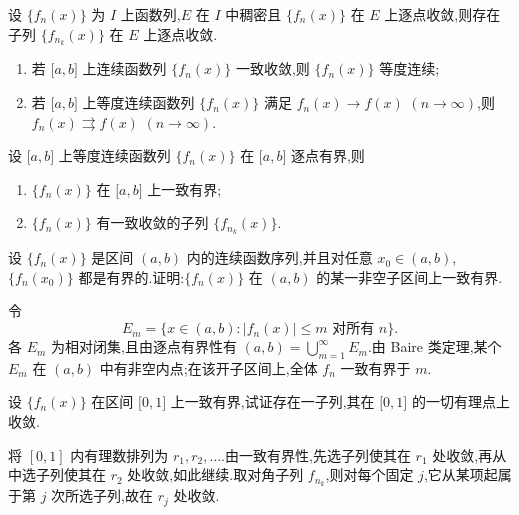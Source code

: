 \begin{theorem}[
        \markstar]
    设 $\{f_n(x)\}$ 为 $I$ 上函数列,$E$ 在 $I$ 中稠密且 $\{f_n(x)\}$ 在 $E$ 上逐点收敛,则存在子列 $\{f_{n_k}(x)\}$ 在 $E$ 上逐点收敛.
\end{theorem}

\begin{theorem}[\markstar]
    \leavevmode
    \begin{enumerate}
        \item 若 $\lbrack a,b\rbrack$ 上连续函数列 $\{f_n(x)\}$ 一致收敛,则 $\{f_n(x)\}$ 等度连续;
        \item 若 $\lbrack a,b\rbrack$ 上等度连续函数列 $\{f_n(x)\}$ 满足 $f_n(x)\to f(x)$ $(n\to\infty)$,则 $f_n(x)\rightrightarrows f(x)$ $(n\to\infty)$.
    \end{enumerate}
\end{theorem}

\begin{theorem}[\markstar]
    设 $\lbrack a,b\rbrack$ 上等度连续函数列 $\{f_n(x)\}$ 在 $\lbrack a,b\rbrack$ 逐点有界,则
    \begin{enumerate}
        \item $\{f_n(x)\}$ 在 $\lbrack a,b\rbrack$ 上一致有界;
        \item $\{f_n(x)\}$ 有一致收敛的子列 $\{f_{n_k}(x)\}$.
    \end{enumerate}
\end{theorem}

\begin{example}
    设 $\{f_n(x)\}$ 是区间 $(a,b)$ 内的连续函数序列,并且对任意 $x_0\in(a,b)$,$\{f_n(x_0)\}$ 都是有界的.证明:$\{f_n(x)\}$ 在 $(a,b)$ 的某一非空子区间上一致有界.
\end{example}
\exampleblank

\begin{solution}
    令
    \[
        E_m=\{x\in(a,b):|f_n(x)|\leq m\text{ 对所有 }n\}.
    \]
    各 $E_m$ 为相对闭集,且由逐点有界性有 $(a,b)=\displaystyle\bigcup_{m=1}^{\infty}E_m$.由 Baire 类定理,某个 $E_m$ 在 $(a,b)$ 中有非空内点;在该开子区间上,全体 $f_n$ 一致有界于 $m$.
\end{solution}

\begin{example}
    设 $\{f_n(x)\}$ 在区间 $\lbrack 0,1\rbrack$ 上一致有界,试证存在一子列,其在 $\lbrack 0,1\rbrack$ 的一切有理点上收敛.
\end{example}
\exampleblank

\begin{solution}
    将 $[0,1]$ 内有理数排列为 $r_1,r_2,\ldots$.由一致有界性,先选子列使其在 $r_1$ 处收敛,再从中选子列使其在 $r_2$ 处收敛,如此继续.取对角子列 $f_{n_k}$,则对每个固定 $j$,它从某项起属于第 $j$ 次所选子列,故在 $r_j$ 处收敛.
\end{solution}

